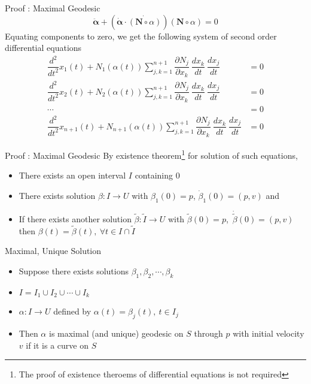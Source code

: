 \documentclass{beamer}
\begin{document}
\begin{frame}{Proof : Maximal Geodesic}
	$$\ddot{\boldsymbol{\alpha}} + (\dot{\boldsymbol{\alpha}} \cdot \dot{(\mathbf{N}\circ \alpha)})(\mathbf{N} \circ \alpha)  = 0 $$
Equating components to zero, we get the following system  of second order differential equations
\begin{align}
	\dfrac{d^2}{dt^2}x_1(t) + N_1(\alpha(t)) \sum_{j,k = 1}^{n+1} \dfrac{\partial N_j}{\partial x_k}\ \dfrac{dx_k}{dt}\ \dfrac{dx_j}{dt} & = 0  \nonumber \\
	\dfrac{d^2}{dt^2}x_2(t) + N_2(\alpha(t)) \sum_{j,k = 1}^{n+1} \dfrac{\partial N_j}{\partial x_k}\ \dfrac{dx_k}{dt}\ \dfrac{dx_j}{dt} & = 0   \\
	\cdots & = 0 \nonumber \\
	\dfrac{d^2}{dt^2}x_{n+1}(t) + N_{n+1}(\alpha(t)) \sum_{j,k = 1}^{n+1} \dfrac{\partial N_j}{\partial x_k}\ \dfrac{dx_k}{dt}\ \dfrac{dx_j}{dt} & = 0  \nonumber 
\end{align}
\end{frame}

\begin{frame}{Proof : Maximal Geodesic}
	By existence theorem\ddag\footnote{The proof of existence theroems of differential equations is not required} for solution of such equations,
\begin{itemize}
	\item There exists an open interval $I$ containing $0$
	\item There exists solution $\beta : I \to U$ with $\beta_1(0) = p$, $\dot{\beta}_1(0)=(p,v)$ and
	\item If there exists another solution $\tilde{\beta} : \tilde{I} \to U$ with $\tilde{\beta}(0) = p$,\ $\dot{\tilde{\beta}}(0) = (p,v)$ then $\beta(t) = \tilde{\beta}(t),\ \forall t \in I \cap \tilde{I}$
\end{itemize}
\begin{block}{Maximal, Unique Solution}
\begin{itemize}
	\item Suppose there exists solutions $\beta_1,\beta_2,\cdots,\beta_k$
	\item $I = I_1 \cup I_2 \cup \cdots \cup I_k $
	\item $\alpha : I \to U$ defined by $\alpha(t) = \beta_j(t),\ t \in I_j$
	\item Then $\alpha$ is maximal (and unique) geodesic on $S$ through $p$ with initial velocity $v$ {\color{red} if it is a curve on $S$}
\end{itemize}
\end{block}
\end{frame}
\end{document}
